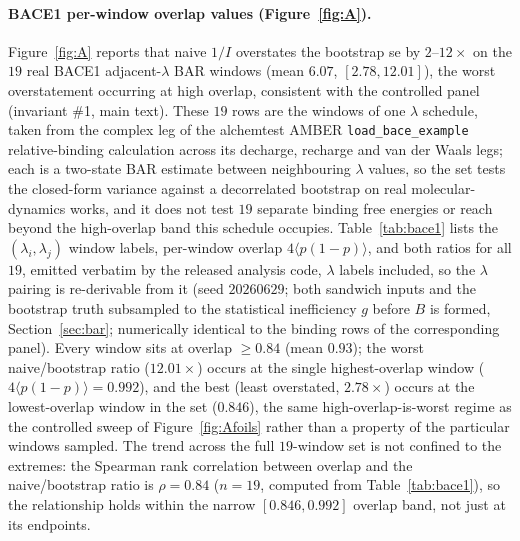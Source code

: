 \paragraph{BACE1 per-window overlap values (Figure~\ref{fig:A}).} Figure~\ref{fig:A} reports
that naive $1/I$ overstates the bootstrap se by $2$--$12\times$ on the $19$ real BACE1
adjacent-$\lambda$ BAR windows (mean $6.07$, $[2.78,12.01]$), the worst overstatement occurring at high
overlap, consistent with the controlled panel (invariant \#1, main text). These $19$ rows are the
windows of one $\lambda$ schedule, taken from the complex leg of the alchemtest AMBER
\texttt{load\_bace\_example} relative-binding calculation across its decharge, recharge and van
der Waals legs; each is a two-state BAR estimate between neighbouring $\lambda$ values, so the set
tests the closed-form variance against a decorrelated bootstrap on real molecular-dynamics works,
and it does not test $19$ separate binding free energies or reach beyond the high-overlap band this
schedule occupies. Table~\ref{tab:bace1}
lists the $(\lambda_i,\lambda_j)$ window labels, per-window overlap $4\langle p(1-p)\rangle$,
and both ratios for all $19$, emitted verbatim by the released analysis code, $\lambda$ labels
included, so the $\lambda$ pairing is re-derivable from it (seed $20260629$; both sandwich inputs
and the bootstrap truth subsampled to the statistical inefficiency $g$ before $B$ is formed,
Section~\ref{sec:bar}; numerically identical to the binding rows of the corresponding panel).
Every window sits at overlap $\geq0.84$ (mean $0.93$); the worst naive/bootstrap ratio ($12.01\times$)
occurs at the single highest-overlap window ($4\langle p(1-p)\rangle=0.992$), and the best (least
overstated, $2.78\times$) occurs at the lowest-overlap window in the set ($0.846$), the same
high-overlap-is-worst regime as the controlled sweep of Figure~\ref{fig:Afoils} rather than a property
of the particular windows sampled. The trend across the full $19$-window set is not confined to
the extremes: the Spearman rank correlation between overlap and the
naive/bootstrap ratio is $\rho=0.84$ ($n=19$, computed from Table~\ref{tab:bace1}), so the
relationship holds within the narrow $[0.846,0.992]$ overlap band, not just at its endpoints.

